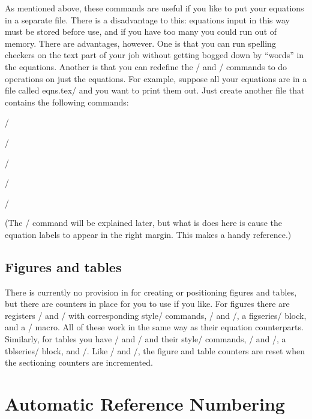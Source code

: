 \begin{(|it
name|/)}
\begin{(|it
name|/)}
\begin{narrow}[.80in]
\begin{narrow}
\begin{eqnseries}
As mentioned above, these commands are useful if you like to put your equations
in a separate file.  There is a disadvantage to this: equations input in this
way must be stored before use, and if you have too many you could run out of
memory.  There are advantages, however.  One is that you can run spelling
checkers on the text part of your job without getting bogged down by ``words''
in the equations.  Another is that you can redefine the \tts\equation/ and
\tts\Equation/ commands to do operations on just the equations.  For example,
suppose all your equations are in a file called \tts eqns.tex/ and you want to
print them out.  Just create another file that contains the following commands:

\smallskip

\tts\typesize=12pt/ \par
\tts\draft/ \par
\tts{}/ \par
\tts{}/ \par
\tts \par
\tts\bye/ \par

\smallskip

\noindent (The \tts\draft/ command will be explained later, but what is does
here is cause the equation labels to appear in the right margin.  This makes
a handy reference.)

{\sl\subsection{Figures and tables}}

There is currently no provision in \jyTeX{} for creating or positioning figures
and tables, but there are counters in place for you to use if you like.  For
figures there are registers \tts\figurenum/ and \tts\subfigurenum/ with
corresponding \tts style/ commands, \tts\figlabel/ and \tts\putfig/, a \tts
figseries/ block, and a \tts\figlabelformat/ macro.  All of these work in the
same way as their equation counterparts.  Similarly, for tables you have
\tts\tablenum/ and \tts\subtablenum/ and their \tts style/ commands,
\tts\tbllabel/ and \tts\puttbl/, a \tts tblseries/ block, and
\tts\tbllabelformat/.  Like \tts\equationnum/ and \tts\subequationnum/, the
figure and table counters are reset when the sectioning counters are
incremented.


{\bigfonts\bfs\section{Automatic Reference Numbering}}


\end{eqnseries}
\end{narrow}
\end{narrow}
\end{(|it
name|/)}
\end{(|it
name|/)}
